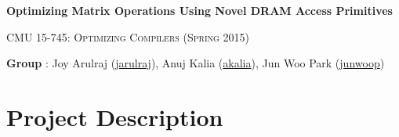 \documentclass[letterpaper]{article}
\makeatletter
\newcommand{\email}[1]{\href{mailto:#1@cs.cmu.edu}{#1}}
\makeatother
\begin{document}
\section*{}
\begin{center}
  \centerline{\textbf{\Large Optimizing Matrix Operations Using Novel DRAM
  Access Primitives}}
  \vspace{1em}
  \textsc{\large CMU 15-745: Optimizing Compilers (Spring 2015)} \\
  \vspace{3em}
  \centerline{\large{\textbf{Group} : Joy Arulraj (\email{jarulraj}), Anuj Kalia
  (\email{akalia})}, Jun Woo Park (\email{junwoop}) }
  \vspace{1em}
\end{center}

\section{Project Description}
\end{document}
